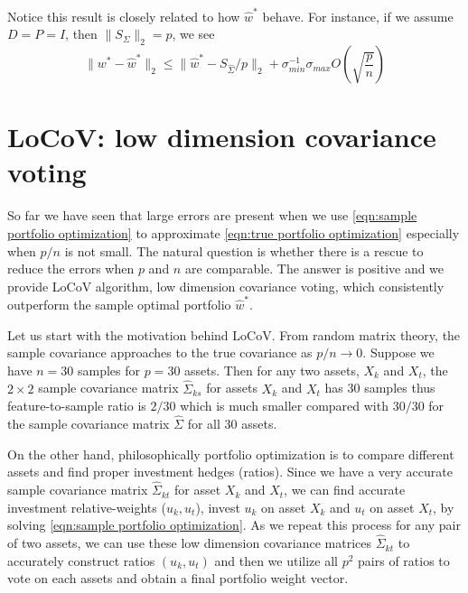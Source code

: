 \documentclass[12pt]{extarticle}
\newcommand{\1}{\mathbbm{1}}
\numberwithin{equation}{section}
\begin{document}
Notice this result is closely related to how $\hat{w}^*$ behave.  For instance, if we assume $D=P=I$, then $\|S_{\Sigma}\|_2 = p$, we see 
\[
\|w^* - \hat{w}^* \|_2 \le \|\hat{w}^* - S_{\hat{\Sigma}}/p \|_2 +    \sigma_{min}^{-1} \sigma_{max}  O(\sqrt{\frac{p}{n}})
\]

\section{LoCoV: low dimension covariance voting}
So far we have seen that large errors are present when we use \ref{eqn:sample portfolio optimization} to approximate \ref{eqn:true portfolio optimization} especially when $p/n$ is not small. The natural question is whether there is a rescue to reduce the errors when $p$ and $n$ are comparable. The answer is positive and we provide LoCoV algorithm, low dimension covariance voting, which consistently outperform the sample optimal portfolio $\hat{w}^*$. 

Let us start with the motivation behind LoCoV. From random matrix theory, the sample covariance approaches to the true covariance as $p/n \to 0$. Suppose we have $n=30$ samples for $p=30$ assets. Then for any two assets, $X_k$ and $X_t$, the $2 \times 2$ sample covariance matrix $\hat{\Sigma}_{ks}$ for assets $X_k$ and $X_t$  has 30 samples thus feature-to-sample ratio is $2/30$ which is much smaller compared with $30/30$ for the sample covariance matrix $\hat{\Sigma}$ for all 30 assets.

On the other hand, philosophically portfolio optimization is to compare different assets and find proper investment hedges (ratios). Since we have a very accurate sample covariance matrix $\hat{\Sigma}_{kt}$ for asset $X_k$ and $X_t$, we can find accurate investment relative-weights ($u_k, u_t$), invest $u_k$ on asset $X_k$ and $u_t$ on asset $X_t$, by solving \ref{eqn:sample portfolio optimization}. As we repeat this process for any pair of two assets, we can use these low dimension covariance matrices $\hat{\Sigma}_{kt}$ to accurately construct ratios $(u_k, u_t)$ and then we utilize all $p^2$ pairs of ratios to vote on each assets and obtain a final portfolio weight vector.
\end{document}
